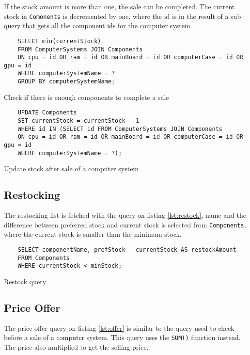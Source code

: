 \documentclass[12pt,a4paper]{article}
\begin{document}
If the stock amount is more than one, the sale can be completed. 
The current stock in \texttt{Comonents} is decremented by one, where the id is in the result of a sub query that gets all the component ids for the computer system.

\begin{listing}[!htbp]
    \begin{verbatim}
    SELECT min(currentStock)
    FROM ComputerSystems JOIN Components 
    ON cpu = id OR ram = id OR mainBoard = id OR computerCase = id OR gpu = id
    WHERE computerSystemName = ?
    GROUP BY computerSystemName;
    \end{verbatim}
    \caption{Check if there is enough components to complete a sale}
    \label{lst:salequery}
\end{listing}

\begin{listing}[!htbp]
	\begin{verbatim}
    UPDATE Components
    SET currentStock = currentStock - 1
    WHERE id IN (SELECT id FROM ComputerSystems JOIN Components
    ON cpu = id OR ram = id OR mainBoard = id OR computerCase = id OR gpu = id
    WHERE computerSystemName = ?);
	\end{verbatim}
	\caption{Update stock after sale of a computer system}
\label{lst:saleupdate}
\end{listing}

\subsection{Restocking}

The restocking list is fetched with the query on listing  \ref{lst:restock}, name and the difference between preferred stock and current stock is selected from \texttt{Components}, where the current stock is smaller than the minimum stock.

\begin{listing}[!htbp]
	\begin{verbatim}
    SELECT componentName, prefStock - currentStock AS restockAmount
    FROM Components
    WHERE currentStock < minStock;
	\end{verbatim}
	\caption{Restock query}
    \label{lst:restock}
\end{listing}

\subsection{Price Offer}
The price offer query on listing \ref{lst:offer} is similar to the query used to check before a sale of a computer system. This query uses the \texttt{SUM()} function instead. 
The price also multiplied to get the selling price.
\end{document}
